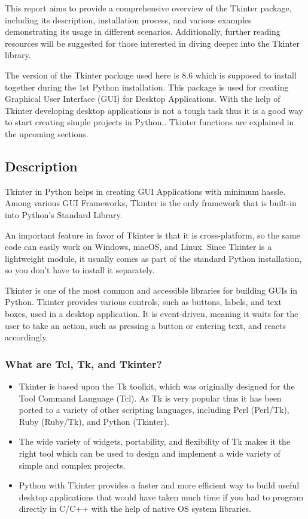 This report aims to provide a comprehensive overview of the Tkinter package, including its description, installation process, and various examples demonstrating its usage in different scenarios. Additionally, further reading resources will be suggested for those interested in diving deeper into the Tkinter library. 

The version of the Tkinter package used here is 8.6 which is supposed to install together during the 1st Python installation. This package is used for creating Graphical User Interface (GUI) for Desktop Applications. With the help of Tkinter developing desktop applications is not a tough task thus it is a good way to start creating simple projects in Python.. Tkinter functions are explained in the upcoming sections.

\subsection{Description}

Tkinter in Python helps in creating GUI Applications with minimum hassle. Among various GUI Frameworks, Tkinter is the only framework that is built-in into Python's Standard Library.

An important feature in favor of Tkinter is that it is cross-platform, so the same code can easily work on Windows, macOS, and Linux. Since Tkinter is a lightweight module, it usually comes as part of the standard Python installation, so you don't have to install it separately.

Tkinter is one of the most common and accessible libraries for building GUIs in Python. Tkinter provides various controls, such as buttons, labels, and text boxes, used in a desktop application. It is event-driven, meaning it waits for the user to take an action, such as pressing a button or entering text, and reacts accordingly.

\subsubsection{What are Tcl, Tk, and Tkinter?}

\begin{itemize}
    
    \item Tkinter is based upon the Tk toolkit, which was originally designed for the Tool Command Language (Tcl). As Tk is very popular thus it has been ported to a variety of other scripting languages, including Perl (Perl/Tk), Ruby (Ruby/Tk), and Python (Tkinter).
    
    \item The wide variety of widgets, portability, and flexibility of Tk makes it the right tool which can be used to design and implement a wide variety of simple and complex projects.
    
    \item Python with Tkinter provides a faster and more efficient way to build useful desktop applications that would have taken much time if you had to program directly in C/C++ with the help of native OS system libraries.
    
\end{itemize}

